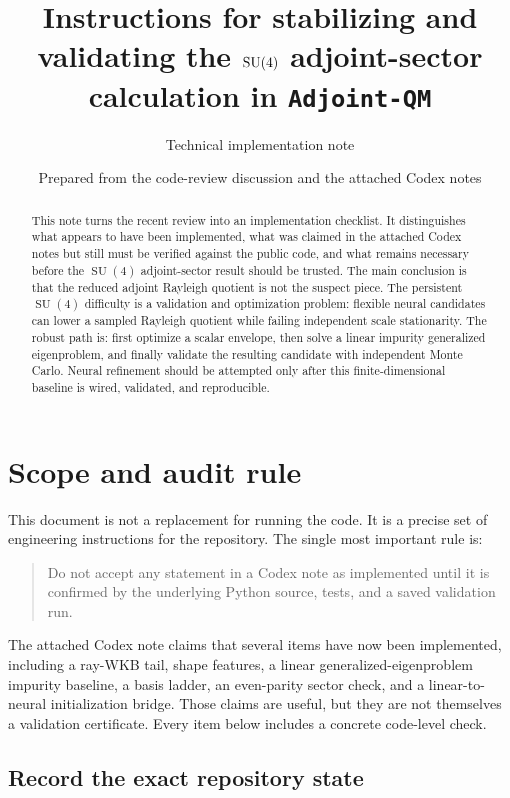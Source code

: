 \documentclass[11pt]{article}
\title{Instructions for stabilizing and validating the \(\SU(4)\) adjoint-sector calculation in \texttt{Adjoint-QM}}
\author{Technical implementation note}
\date{Prepared from the code-review discussion and the attached Codex notes}
\newcommand{\SU}{\operatorname{SU}}
\begin{document}
\maketitle

\begin{abstract}
This note turns the recent review into an implementation checklist. It distinguishes what appears to have been implemented, what was claimed in the attached Codex notes but still must be verified against the public code, and what remains necessary before the \(\SU(4)\) adjoint-sector result should be trusted. The main conclusion is that the reduced adjoint Rayleigh quotient is not the suspect piece. The persistent \(\SU(4)\) difficulty is a validation and optimization problem: flexible neural candidates can lower a sampled Rayleigh quotient while failing independent scale stationarity. The robust path is: first optimize a scalar envelope, then solve a linear impurity generalized eigenproblem, and finally validate the resulting candidate with independent Monte Carlo. Neural refinement should be attempted only after this finite-dimensional baseline is wired, validated, and reproducible.
\end{abstract}

\tableofcontents
\newpage

\section{Scope and audit rule}

This document is not a replacement for running the code. It is a precise set of engineering instructions for the repository.
The single most important rule is:
\begin{quote}
Do not accept any statement in a Codex note as implemented until it is confirmed by the underlying Python source, tests, and a saved validation run.
\end{quote}

The attached Codex note claims that several items have now been implemented, including a ray-WKB tail, shape features, a linear generalized-eigenproblem impurity baseline, a basis ladder, an even-parity sector check, and a linear-to-neural initialization bridge. Those claims are useful, but they are not themselves a validation certificate. Every item below includes a concrete code-level check.

\subsection{Record the exact repository state}
\end{document}
